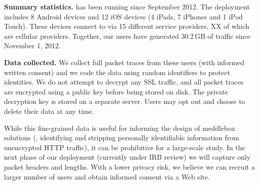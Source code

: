 \noindent\textbf{Summary statistics.} \meddle has been running 
since September 2012. The deployment includes 8 Android devices 
and 12 iOS devices (4 iPads, 7 iPhones and 1 iPod Touch). These 
devices connect to \meddle via 15 different service providers, 
XX of which are cellular providers. Together, our users have 
generated 30.2\,GB of traffic since November 1, 2012. 

\noindent\textbf{Data collected.}
We collect full packet traces from these users 
(with informed written consent) and we code the data using random identifiers 
to protect identities. We do not attempt to decrypt any SSL traffic, 
and all packet traces are encrypted using a public key before being 
stored on disk. The private decryption key is stored on a separate server. 
Users may opt out and choose to delete their data at any time. 

While this fine-grained data is useful for informing the design of meddlebox solutions (\eg, 
identifying and stripping personally identifiable information from unencrypted 
HTTP traffic), it can be prohibitive for a large-scale study. In the next phase of 
our deployment (currently under IRB review) we will capture only packet headers 
and lengths. With a lower privacy risk, we believe we can recruit a larger number 
of users and obtain informed consent via a Web site. 

   

 
 
